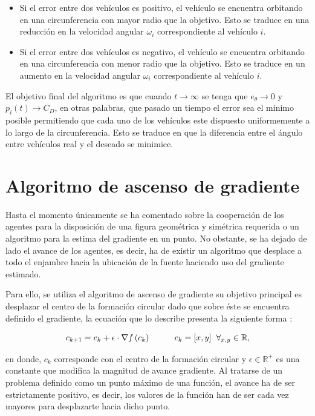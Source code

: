\begin{itemize}
	\item Si el error entre dos vehículos es positivo, el vehículo se encuentra orbitando en una circunferencia con mayor radio que la objetivo. Esto se traduce en una reducción en la velocidad angular $\omega_{i}$ correspondiente al vehículo $i$.\newpage
	\item Si el error entre dos vehículos es negativo, el vehículo se encuentra orbitando en una circunferencia con menor radio que la objetivo. Esto se traduce en un aumento en la velocidad angular $\omega_{i}$ correspondiente al vehículo $i$.
\end{itemize}

El objetivo final del algoritmo es que cuando $t\rightarrow\infty$ se tenga que $e_{\theta}\rightarrow{0}$ y $p_{i}\left(t\right)\rightarrow{C_D}$, en otras palabras, que pasado un tiempo el error sea el mínimo posible permitiendo que cada uno de los vehículos este dispuesto uniformemente a lo largo de la circunferencia. Esto se traduce en que la diferencia entre el ángulo entre vehículos real y el deseado se minimice. 

\section{Algoritmo de ascenso de gradiente}

Hasta el momento únicamente se ha comentado sobre la cooperación de los agentes para la disposición de una figura geométrica y simétrica requerida o un algoritmo para la estima del gradiente en un punto. No obstante, se ha dejado de lado el avance de los agentes, es decir, ha de existir un algoritmo que desplace a todo el enjambre hacia la ubicación de la fuente haciendo uso del gradiente estimado.

Para ello, se utiliza el algoritmo de ascenso de gradiente su objetivo principal es desplazar el centro de la formación circular dado que sobre éste se encuentra definido el gradiente, la ecuación que lo describe presenta la siguiente forma \cite{Adicional_Estimacion_1}:

\begin{equation}\label{GA}
	c_{k+1}=c_k+\epsilon\cdot\nabla{f}\left(c_k\right)\hspace{10mm}c_k=[x,y]\hspace{2mm}\forall_{x,y}\in\mathbb{R},
\end{equation}

en donde, $c_k$ corresponde con el centro de la formación circular y $\epsilon\in\mathbb{R}^{+}$ es una constante que modifica la magnitud de avance gradiente. Al tratarse de un problema definido como un punto máximo de una función, el avance ha de ser estrictamente positivo, es decir, los valores de la función han de ser cada vez mayores para desplazarte hacia dicho punto.


